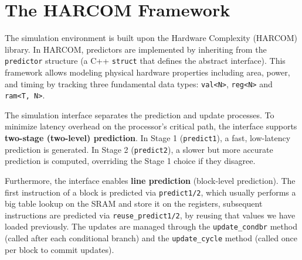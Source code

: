 \documentclass[11pt,a4paper,twocolumn]{article}
\begin{document}
\section{The HARCOM Framework}
\label{sec:harcom}

The simulation environment is built upon the Hardware Complexity (HARCOM) library. In HARCOM, predictors are implemented by inheriting from the \texttt{predictor} structure (a C++ \texttt{struct} that defines the abstract interface). This framework allows modeling physical hardware properties including area, power, and timing by tracking three fundamental data types: \texttt{val<N>}, \texttt{reg<N>} and \texttt{ram<T, N>}.


The simulation interface separates the prediction and update processes. To minimize latency overhead on the processor's critical path, the interface supports \textbf{two-stage (two-level) prediction}. In Stage 1 (\texttt{predict1}), a fast, low-latency prediction is generated. In Stage 2 (\texttt{predict2}), a slower but more accurate prediction is computed, overriding the Stage 1 choice if they disagree. 

Furthermore, the interface enables \textbf{line prediction} (block-level prediction). The first instruction of a block is predicted via \texttt{predict1/2}, which usually performs a big table lookup on the SRAM and store it on the registers, subsequent instructions are predicted via \texttt{reuse\_predict1/2}, by reusing that values we have loaded previously. The updates are managed through the \texttt{update\_condbr} method (called after each conditional branch) and the \texttt{update\_cycle} method (called once per block to commit updates). 
\end{document}

